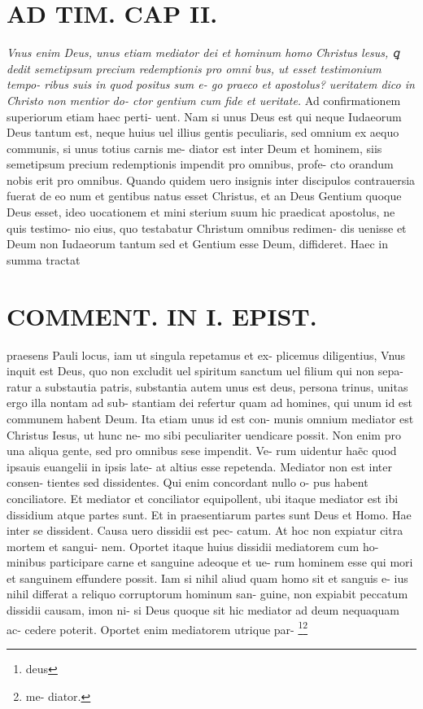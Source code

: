 \documentclass{article}
\begin{document}
\begin{pages}
\section*{AD TIM. CAP II. }
\marginpar{[ p.116 ]}
\textit{Vnus enim Deus, unus etiam mediator dei et hominum homo Christus lesus, ꝗ dedit semetipsum precium redemptionis pro omni bus, ut esset testimonium tempo- ribus suis in quod positus sum e- go praeco et apostolus? ueritatem dico in Christo non mentior do- ctor gentium cum fide et ueritate. }\pstart Ad confirmationem superiorum etiam haec perti- uent. Nam si unus Deus est qui neque Iudaeorum Deus tantum est, neque huius uel illius gentis peculiaris, sed omnium ex aequo communis, si unus totius carnis me- diator est inter Deum et hominem, siis semetipsum precium redemptionis impendit pro omnibus, profe- cto orandum nobis erit pro omnibus. Quando quidem uero insignis inter discipulos contrauersia fuerat de eo num et gentibus natus esset Christus, et an Deus Gentium quoque Deus esset, ideo uocationem et mini sterium suum hic praedicat apostolus, ne quis testimo- nio eius, quo testabatur Christum omnibus redimen- dis uenisse et Deum non Iudaeorum tantum sed et Gentium esse Deum, diffideret. Haec in summa tractat  \pend
\section*{COMMENT. IN I. EPIST. }\pstart praesens Pauli locus, iam ut singula repetamus et ex- plicemus diligentius, Vnus inquit est Deus, quo non excludit uel spiritum sanctum uel filium qui non sepa- ratur a substautia patris, substantia autem unus est deus, persona trinus, unitas ergo illa nontam ad sub- stantiam dei refertur quam ad homines, qui unum id est communem habent Deum. Ita etiam unus id est con- munis omnium mediator est Christus Iesus, ut hunc ne- mo sibi peculiariter uendicare possit. Non enim pro una aliqua gente, sed pro omnibus sese impendit. Ve- rum uidentur haẽc quod ipsauis euangelii in ipsis late- at altius esse repetenda. Mediator non est inter consen- tientes sed dissidentes. Qui enim concordant nullo o- pus habent conciliatore. Et mediator et conciliator equipollent, ubi itaque mediator est ibi dissidium atque partes sunt. Et in praesentiarum partes sunt Deus et Homo. Hae inter se dissident. Causa uero dissidii est pec- catum. At hoc non expiatur citra mortem et sangui- nem. Oportet itaque huius dissidii mediatorem cum ho- minibus participare carne et sanguine adeoque et ue- rum hominem esse qui mori et sanguinem effundere possit. Iam si nihil aliud quam homo sit et sanguis e- ius nihil differat a reliquo corruptorum hominum san- guine, non expiabit peccatum dissidii causam, imon ni- si Deus quoque sit hic mediator ad deum nequaquam ac- cedere poterit. Oportet enim mediatorem utrique par-  \pend\footnote{\footnotesizeVnus deus }\footnote{\footnotesizeVnus me- diator. }

\end{pages}
\end{document}
